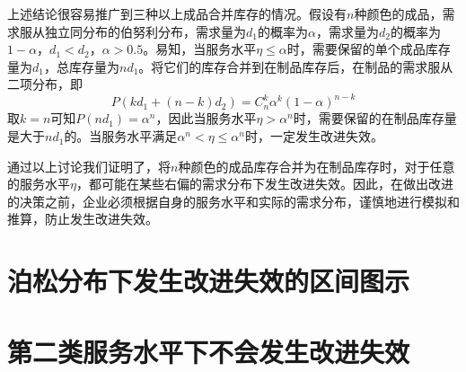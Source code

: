 上述结论很容易推广到三种以上成品合并库存的情况。假设有$n$种颜色的成品，需求服从独立同分布的伯努利分布，需求量为$d_1$的概率为$\alpha$，需求量为$d_2$的概率为$1-\alpha$，$d_1 < d_2$，$\alpha > 0.5$。易知，当服务水平$\eta \leq \alpha$时，需要保留的单个成品库存量为$d_1$，总库存量为$nd_1$。将它们的库存合并到在制品库存后，在制品的需求服从二项分布，即
\[
P(kd_1+(n-k)d_2) = C_{n}^{k}\alpha^k(1-\alpha)^{n-k}
\]
取$k=n$可知$P(nd_1)=\alpha^n$，因此当服务水平$\eta > \alpha^n$时，需要保留的在制品库存量是大于$nd_1$的。当服务水平满足$\alpha^n < \eta \leq \alpha^n$时，一定发生改进失效。

通过以上讨论我们证明了，将$n$种颜色的成品库存合并为在制品库存时，对于任意的服务水平$\eta$，都可能在某些右偏的需求分布下发生改进失效。因此，在做出改进的决策之前，企业必须根据自身的服务水平和实际的需求分布，谨慎地进行模拟和推算，防止发生改进失效。








\section{泊松分布下发生改进失效的区间图示}












\section{第二类服务水平下不会发生改进失效}




















